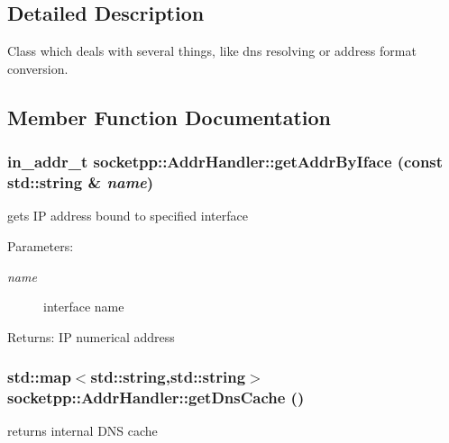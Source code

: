 \subsection{Detailed Description}
Class which deals with several things, like dns resolving or address format conversion. 

\subsection{Member Function Documentation}
\hypertarget{classsocketpp_1_1AddrHandler_75b342f24605c5d167aabaa0422ff1ad}{
\subsubsection[{getAddrByIface}]{\setlength{\rightskip}{0pt plus 5cm}in\_\-addr\_\-t socketpp::AddrHandler::getAddrByIface (const std::string \& {\em name})}}
\label{classsocketpp_1_1AddrHandler_75b342f24605c5d167aabaa0422ff1ad}


gets IP address bound to specified interface 

\begin{Desc}
\item[Parameters:]
\begin{description}
\item[{\em name}]interface name \end{description}
\end{Desc}
\begin{Desc}
\item[Returns:]IP numerical address \end{Desc}
\hypertarget{classsocketpp_1_1AddrHandler_4e10f2291b27d7db2a2860502721f960}{
\subsubsection[{getDnsCache}]{\setlength{\rightskip}{0pt plus 5cm}std::map$<$std::string,std::string$>$ socketpp::AddrHandler::getDnsCache ()}}
\label{classsocketpp_1_1AddrHandler_4e10f2291b27d7db2a2860502721f960}


returns internal DNS cache 

